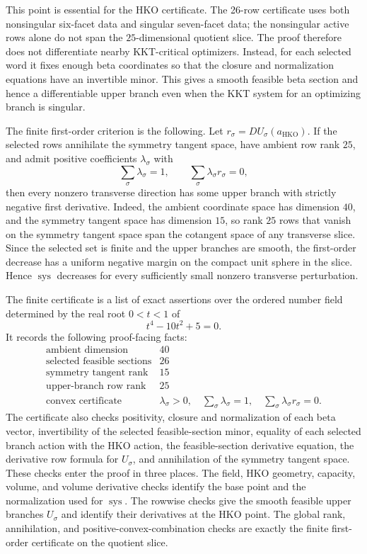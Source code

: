 This point is essential for the HKO certificate. The 26-row certificate uses
both nonsingular six-facet data and singular seven-facet data; the
nonsingular active rows alone do not span the \(25\)-dimensional quotient
slice. The proof therefore does not differentiate nearby KKT-critical
optimizers. Instead, for each selected word it fixes enough beta coordinates
so that the closure and normalization equations have an invertible minor. This
gives a smooth feasible beta section and hence a differentiable upper branch
even when the KKT system for an optimizing branch is singular.

The finite first-order criterion is the following. Let
\(r_\sigma=D U_\sigma(a_{\mathrm{HKO}})\). If the selected rows annihilate the
symmetry tangent space, have ambient row rank \(25\), and admit positive
coefficients \(\lambda_\sigma\) with
\[
  \sum_\sigma\lambda_\sigma=1,
  \qquad
  \sum_\sigma\lambda_\sigma r_\sigma=0,
\]
then every nonzero transverse direction has some upper branch with strictly
negative first derivative. Indeed, the ambient coordinate space has dimension
\(40\), and the symmetry tangent space has dimension \(15\), so rank \(25\)
rows that vanish on the symmetry tangent space span the cotangent space of any
transverse slice. Since the selected set is finite and the upper branches are
smooth, the first-order decrease has a uniform negative margin on the compact
unit sphere in the slice. Hence \(\operatorname{sys}\) decreases for every
sufficiently small nonzero transverse perturbation.

The finite certificate is a list of exact assertions over the ordered number
field determined by the real root \(0<t<1\) of
\[
  t^4-10t^2+5=0.
\]
It records the following proof-facing facts:
\[
\begin{array}{ll}
\text{ambient dimension} & 40\\
\text{selected feasible sections} & 26\\
\text{symmetry tangent rank} & 15\\
\text{upper-branch row rank} & 25\\
\text{convex certificate} &
  \lambda_\sigma>0,\quad
  \sum_\sigma\lambda_\sigma=1,\quad
  \sum_\sigma\lambda_\sigma r_\sigma=0.
\end{array}
\]
The certificate also checks positivity, closure and normalization of each beta
vector, invertibility of the selected feasible-section minor, equality of each
selected branch action with the HKO action, the feasible-section derivative
equation, the derivative row formula for \(U_\sigma\), and annihilation of the
symmetry tangent space. These checks enter the proof in three places. The
field, HKO geometry, capacity, volume, and volume derivative checks identify
the base point and the normalization used for \(\operatorname{sys}\). The
rowwise checks give the smooth feasible upper branches \(U_\sigma\) and
identify their derivatives at the HKO point. The global rank, annihilation, and
positive-convex-combination checks are exactly the finite first-order
certificate on the quotient slice.

